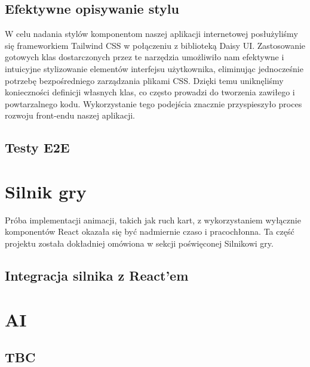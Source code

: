 \subsection{Efektywne opisywanie stylu}
W celu nadania stylów komponentom naszej aplikacji internetowej posłużyliśmy się frameworkiem Tailwind CSS w połączeniu z biblioteką Daisy UI. Zastosowanie gotowych klas dostarczonych przez te narzędzia umożliwiło nam efektywne i intuicyjne stylizowanie elementów interfejsu użytkownika, eliminując jednocześnie potrzebę bezpośredniego zarządzania plikami CSS. Dzięki temu uniknęliśmy konieczności definicji własnych klas, co często prowadzi do tworzenia zawiłego i powtarzalnego kodu. Wykorzystanie tego podejścia znacznie przyspieszyło proces rozwoju front-endu naszej aplikacji.
\subsection{Testy E2E}


\section{Silnik gry}
\label{subsec:silnik_gry}
Próba implementacji animacji, takich jak ruch kart, z wykorzystaniem wyłącznie komponentów React okazała się być nadmiernie czaso i pracochłonna. Ta część projektu została dokładniej omówiona w sekcji poświęconej Silnikowi gry.

\subsection{Integracja silnika z React'em}


\section{AI}

\subsection{TBC}
